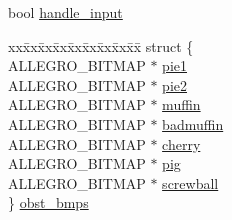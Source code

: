 \begin{DoxyCompactItemize}
\item 
bool \hyperlink{structDodger_ad73ee458898eeadb95285483a51d354f}{handle\+\_\+input}
\item 
\begin{tabbing}
xx\=xx\=xx\=xx\=xx\=xx\=xx\=xx\=xx\=\kill
struct \{\\
\>ALLEGRO\_BITMAP $\ast$ \hyperlink{structDodger_a4f7d7343cac6f73d52ad090f3a6a19c3}{pie1}\\
\>ALLEGRO\_BITMAP $\ast$ \hyperlink{structDodger_a10322a7b25a6622f22dbde738d58151c}{pie2}\\
\>ALLEGRO\_BITMAP $\ast$ \hyperlink{structDodger_a9848452f9b8886eaeb49824abd98cfa2}{muffin}\\
\>ALLEGRO\_BITMAP $\ast$ \hyperlink{structDodger_a10d42f3b0807e8d538e23d459de7cddc}{badmuffin}\\
\>ALLEGRO\_BITMAP $\ast$ \hyperlink{structDodger_a374d77e3c665e735db2c92f457d80273}{cherry}\\
\>ALLEGRO\_BITMAP $\ast$ \hyperlink{structDodger_a940e169cb64d0cd3d3a532e9b54ab4a0}{pig}\\
\>ALLEGRO\_BITMAP $\ast$ \hyperlink{structDodger_a703df249c4b1572717c221aa48588df3}{screwball}\\
\} \hyperlink{structDodger_a77082385b2097f38e321f99c2ecf98e1}{obst\_bmps}\\

\end{tabbing}\end{DoxyCompactItemize}


